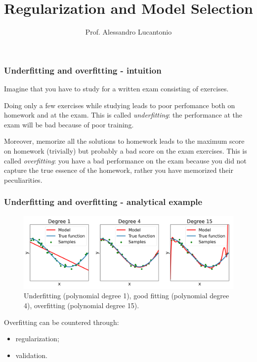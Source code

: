 \documentclass{beamer}
\title{Regularization and Model Selection}
\author{Prof. Alessandro Lucantonio}
\institute{Aarhus University}
\date{}
\begin{document}
	\frame{\titlepage}
	
		\begin{frame}
		\frametitle{Underfitting and overfitting - intuition}
		
		Imagine that you have to study for a written exam consisting of exercises. 
		
		\vspace{5mm}
		
		Doing only a few exercises while studying leads to poor perfomance both on homework and at the exam. This is called \textsl{underfitting}: the performance at the exam will be bad because of poor training.
		
		\vspace{5mm}
		
		Moreover, memorize all the solutions to homework leads to the maximum score on homework (trivially) but probably a bad score on the exam exercises. This is called \textsl{overfitting}: you have a bad performance on the exam because you did not capture the true essence of the homework, rather you have memorized their peculiarities.
	\end{frame}
	
	\begin{frame}
		\frametitle{Underfitting and overfitting - analytical example}
		\begin{figure}
			\centering
			\includegraphics[scale=0.35]{images/overfitting_poly}
			\caption{Underfitting (polynomial degree 1), good fitting (polynomial degree 4), overfitting (polynomial degree 15).}
		\end{figure}
		
		Overfitting can be countered through:
		\begin{itemize}
			\item regularization;
			\item validation.
		\end{itemize}
	\end{frame}
	
\end{document}
